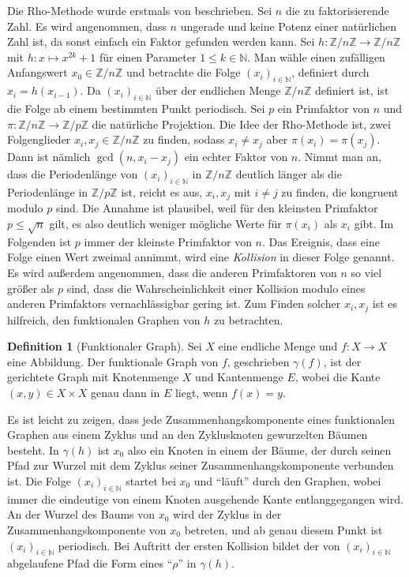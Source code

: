 \documentclass[a4paper, 11pt, ngerman]{article}
\newcommand{\N}{\mathbb{N}}
\newcommand{\Z}{\mathbb{Z}}
\theoremstyle{definition}
\newtheorem{definition}{Definition}
\theoremstyle{plain}
\theoremstyle{remark}
\begin{document}
Die Rho-Methode wurde erstmals von \cite{pol75} beschrieben. Sei $n$ die zu faktorisierende Zahl. Es wird angenommen, dass $n$ ungerade und keine Potenz einer natürlichen Zahl ist, da sonst einfach ein Faktor gefunden werden kann. Sei $h : \Z/n\Z \to \Z/n\Z$ mit $h : x \mapsto x^{2k} + 1$ für einen Parameter $1 \le k \in \N$. Man wähle einen zufälligen Anfangswert $x_0 \in \Z/n\Z$ und betrachte die Folge $(x_i)_{i \in \N}$, definiert durch $x_i = h(x_{i - 1})$. Da $(x_i)_{i \in \N}$ über der endlichen Menge $\Z/n\Z$ definiert ist, ist die Folge ab einem bestimmten Punkt periodisch. Sei $p$ ein Primfaktor von $n$ und $\pi : \Z/n\Z \to \Z/p\Z$ die natürliche Projektion. Die Idee der Rho-Methode ist, zwei Folgenglieder $x_i, x_j \in \Z/n\Z$ zu finden, sodass $x_i \ne x_j$ aber $\pi(x_i) = \pi(x_j)$. Dann ist nämlich $\gcd(n, x_i - x_j)$ ein echter Faktor von $n$. Nimmt man an, dass die Periodenlänge von $(x_i)_{i \in \N}$ in $\Z/n\Z$ deutlich länger als die Periodenlänge in $\Z/p\Z$ ist, reicht es aus, $x_i, x_j$ mit $i \ne j$ zu finden, die kongruent modulo $p$ sind. Die Annahme ist plausibel, weil für den kleinsten Primfaktor $p \le \sqrt n$ gilt, es also deutlich weniger mögliche Werte für $\pi(x_i)$ als $x_i$ gibt. Im Folgenden ist $p$ immer der kleinste Primfaktor von $n$. Das Ereignis, dass eine Folge einen Wert zweimal annimmt, wird eine \emph{Kollision} in dieser Folge genannt. Es wird außerdem angenommen, dass die anderen Primfaktoren von $n$ so viel größer als $p$ sind, dass die Wahrscheinlichkeit einer Kollision modulo eines anderen Primfaktors vernachlässigbar gering ist. Zum Finden solcher $x_i, x_j$ ist es hilfreich, den funktionalen Graphen von $h$ zu betrachten.

\begin{definition}[Funktionaler Graph]
    Sei $X$ eine endliche Menge und $f: X \to X$ eine Abbildung. Der funktionale Graph von $f$, geschrieben $\gamma(f)$, ist der gerichtete Graph mit Knotenmenge $X$ und Kantenmenge $E$, wobei die Kante $(x, y) \in X \times X$ genau dann in $E$ liegt, wenn $f(x) = y$.
\end{definition}

\noindent Es ist leicht zu zeigen, dass jede Zusammenhangskomponente eines funktionalen Graphen aus einem Zyklus und an den Zyklusknoten gewurzelten Bäumen besteht. In $\gamma(h)$ ist $x_0$ also ein Knoten in einem der Bäume, der durch seinen Pfad zur Wurzel mit dem Zyklus seiner Zusammenhangskomponente verbunden ist. Die Folge $(x_i)_{i \in \N}$ startet bei $x_0$ und "`läuft"' durch den Graphen, wobei immer die eindeutige von einem Knoten ausgehende Kante entlanggegangen wird. An der Wurzel des Baums von $x_0$ wird der Zyklus in der Zusammenhangskomponente von $x_0$ betreten, und ab genau diesem Punkt ist $(x_i)_{i \in \N}$ periodisch. Bei Auftritt der ersten Kollision bildet der von $(x_i)_{i \in \N}$ abgelaufene Pfad die Form eines "`$\rho$"' in $\gamma(h)$.
\end{document}
